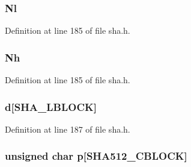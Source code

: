 \subsubsection[{\texorpdfstring{Nl}{Nl}}]{ Nl}\hypertarget{struct_s_h_a512state__st_afe572d1e0fb8cc860669a2539f3f4103}{}\label{struct_s_h_a512state__st_afe572d1e0fb8cc860669a2539f3f4103}


Definition at line 185 of file sha.\+h.

\subsubsection[{\texorpdfstring{Nh}{Nh}}]{ Nh}\hypertarget{struct_s_h_a512state__st_a4cb6c7a664e1c4ffe7657d10422cfe76}{}\label{struct_s_h_a512state__st_a4cb6c7a664e1c4ffe7657d10422cfe76}


Definition at line 185 of file sha.\+h.

\subsubsection[{\texorpdfstring{d}{d}}]{ d\mbox{[}{\bf S\+H\+A\+\_\+\+L\+B\+L\+O\+CK}\mbox{]}}\hypertarget{struct_s_h_a512state__st_a90a4b0655724c1af4884f929f2ade45f}{}\label{struct_s_h_a512state__st_a90a4b0655724c1af4884f929f2ade45f}


Definition at line 187 of file sha.\+h.

\subsubsection[{\texorpdfstring{p}{p}}]{\setlength{\rightskip}{0pt plus 5cm}unsigned char p\mbox{[}{\bf S\+H\+A512\+\_\+\+C\+B\+L\+O\+CK}\mbox{]}}\hypertarget{struct_s_h_a512state__st_a2f3a1cc4e437a508391b2b4ec2c0e572}{}\label{struct_s_h_a512state__st_a2f3a1cc4e437a508391b2b4ec2c0e572}


